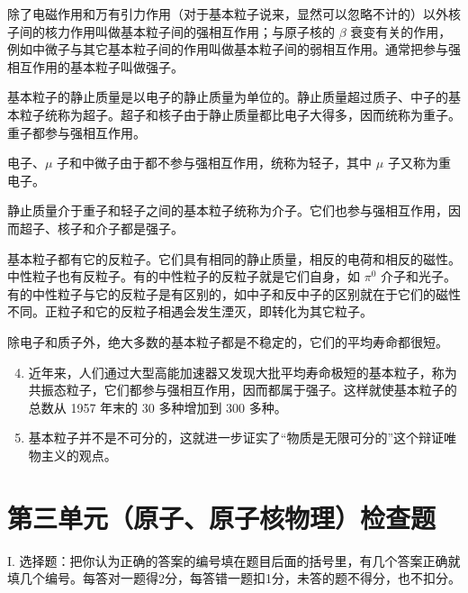除了电磁作用和万有引力作用（对于基本粒子说来，显然可以忽略不计的）以外核子间的核力作用叫做基本粒子间的强相互作用；与原子核的
\(\beta\)
衰变有关的作用，例如中微子与其它基本粒子间的作用叫做基本粒子间的弱相互作用。通常把参与强相互作用的基本粒子叫做强子。

基本粒子的静止质量是以电子的静止质量为单位的。静止质量超过质子、中子的基本粒子统称为超子。超子和核子由于静止质量都比电子大得多，因而统称为重子。重子都参与强相互作用。

电子、\(\mu\) 子和中微子由于都不参与强相互作用，统称为轻子，其中 \(\mu\)
子又称为重电子。

静止质量介于重子和轻子之间的基本粒子统称为介子。它们也参与强相互作用，因而超子、核子和介子都是强子。

基本粒子都有它的反粒子。它们具有相同的静止质量，相反的电荷和相反的磁性。中性粒子也有反粒子。有的中性粒子的反粒子就是它们自身，如
\(\pi^0\)
介子和光子。有的中性粒子与它的反粒子是有区别的，如中子和反中子的区别就在于它们的磁性不同。正粒子和它的反粒子相遇会发生湮灭，即转化为其它粒子。

除电子和质子外，绝大多数的基本粒子都是不稳定的，它们的平均寿命都很短。

\begin{enumerate}
\setcounter{enumi}{3}
\item
  近年来，人们通过大型高能加速器又发现大批平均寿命极短的基本粒子，称为共振态粒子，它们都参与强相互作用，因而都属于强子。这样就使基本粒子的总数从
  1957 年末的 30 多种增加到 300 多种。
\item
  基本粒子并不是不可分的，这就进一步证实了``物质是无限可分的''这个辩证唯物主义的观点。
\end{enumerate}

\chapter{第三单元（原子、原子核物理）检查题}

I.
选择题：把你认为正确的答案的编号填在题目后面的括号里，有几个答案正确就填几个编号。每答对一题得2分，每答错一题扣1分，未答的题不得分，也不扣分。

